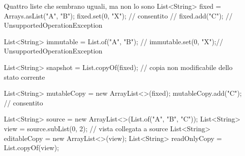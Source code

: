 ﻿\documentclass[10pt,a4paper]{article}
\begin{document}
\begin{codebox}{Quattro liste che sembrano uguali, ma non lo sono}
List<String> fixed = Arrays.asList("A", "B");
fixed.set(0, "X");       // consentito
// fixed.add("C");       // UnsupportedOperationException

List<String> immutable = List.of("A", "B");
// immutable.set(0, "X");// UnsupportedOperationException

List<String> snapshot = List.copyOf(fixed);
// copia non modificabile dello stato corrente

List<String> mutableCopy = new ArrayList<>(fixed);
mutableCopy.add("C");    // consentito

List<String> source = new ArrayList<>(List.of("A", "B", "C"));
List<String> view = source.subList(0, 2); // vista collegata a source
List<String> editableCopy = new ArrayList<>(view);
List<String> readOnlyCopy = List.copyOf(view);
\end{codebox}
\end{document}
